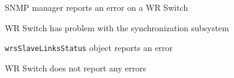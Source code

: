 \begin{figure}
  \begin{center}
    \caption{SNMP manager reports an error on a WR Switch}
    \label{fig:diamon:wrs_error}
  \end{center}
\end{figure}

\begin{figure}
  \begin{center}
    \caption{WR Switch has problem with the synchronization subsystem}
    \label{fig:diamon:wrs_sync_error}
  \end{center}
\end{figure}

\begin{figure}
  \begin{center}
    \caption{\texttt{wrsSlaveLinksStatus} object reports an error}
    \label{fig:diamon:slave_link_error}
  \end{center}
\end{figure}

\begin{figure}
  \begin{center}
    \caption{WR Switch does not report any errors}
    \label{fig:diamon:wrs_ok}
  \end{center}
\end{figure}
